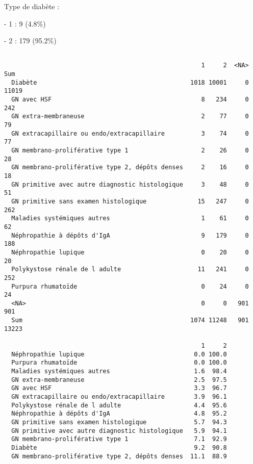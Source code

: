 \documentclass[11pt,a4paper]{article}\usepackage[]{graphicx}\usepackage[]{color}
\makeatletter
\newenvironment{kframe}{%
 \def\at@end@of@kframe{}%
 \ifinner\ifhmode%
  \def\at@end@of@kframe{\end{minipage}}%
  \begin{minipage}{\columnwidth}%
 \fi\fi%
 \def\FrameCommand##1{\hskip\@totalleftmargin \hskip-\fboxsep
 \colorbox{shadecolor}{##1}\hskip-\fboxsep
     \hskip-\linewidth \hskip-\@totalleftmargin \hskip\columnwidth}%
 \MakeFramed {\advance\hsize-\width
   \@totalleftmargin\z@ \linewidth\hsize
   \@setminipage}}%
 {\par\unskip\endMakeFramed%
 \at@end@of@kframe}
\newenvironment{knitrout}{}{} %
\makeatother
\begin{document}
Type de diabète : 

- 1 : 9 (4.8\%)

- 2 : 179 (95.2\%)

\begin{knitrout}
\color{fgcolor}\begin{kframe}
\begin{verbatim}
                                                 
                                                      1     2  <NA>   Sum
  Diabète                                          1018 10001     0 11019
  GN avec HSF                                         8   234     0   242
  GN extra-membraneuse                                2    77     0    79
  GN extracapillaire ou endo/extracapillaire          3    74     0    77
  GN membrano-proliférative type 1                    2    26     0    28
  GN membrano-proliférative type 2, dépôts denses     2    16     0    18
  GN primitive avec autre diagnostic histologique     3    48     0    51
  GN primitive sans examen histologique              15   247     0   262
  Maladies systémiques autres                         1    61     0    62
  Néphropathie à dépôts d'IgA                         9   179     0   188
  Néphropathie lupique                                0    20     0    20
  Polykystose rénale de l adulte                     11   241     0   252
  Purpura rhumatoïde                                  0    24     0    24
  <NA>                                                0     0   901   901
  Sum                                              1074 11248   901 13223
                                                 
                                                      1     2
  Néphropathie lupique                              0.0 100.0
  Purpura rhumatoïde                                0.0 100.0
  Maladies systémiques autres                       1.6  98.4
  GN extra-membraneuse                              2.5  97.5
  GN avec HSF                                       3.3  96.7
  GN extracapillaire ou endo/extracapillaire        3.9  96.1
  Polykystose rénale de l adulte                    4.4  95.6
  Néphropathie à dépôts d'IgA                       4.8  95.2
  GN primitive sans examen histologique             5.7  94.3
  GN primitive avec autre diagnostic histologique   5.9  94.1
  GN membrano-proliférative type 1                  7.1  92.9
  Diabète                                           9.2  90.8
  GN membrano-proliférative type 2, dépôts denses  11.1  88.9
\end{verbatim}
\end{kframe}
\end{knitrout}
~\\
\end{document}
